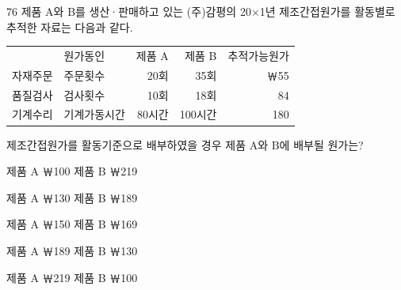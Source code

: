 \begin{question}{76}
제품 A와 B를 생산·판매하고 있는 (주)감평의 20×1년 제조간접원가를 활동별로 추적한 자료는 다음과 같다.
\begin{framedtext}
{\small\begin{tabular}{@{}llrrr@{}}
 & 원가동인 & 제품 A & 제품 B & 추적가능원가 \\
자재주문 & 주문횟수 & 20회 & 35회 & ￦55 \\
품질검사 & 검사횟수 & 10회 & 18회 & 84 \\
기계수리 & 기계가동시간 & 80시간 & 100시간 & 180 \\
\end{tabular}\par}
\end{framedtext}
제조간접원가를 활동기준으로 배부하였을 경우 제품 A와 B에 배부될 원가는?
\begin{choices}
  \item 제품 A ￦100 \quad 제품 B ￦219
  \item 제품 A ￦130 \quad 제품 B ￦189
  \item 제품 A ￦150 \quad 제품 B ￦169
  \item 제품 A ￦189 \quad 제품 B ￦130
  \item 제품 A ￦219 \quad 제품 B ￦100
\end{choices}
\end{question}
